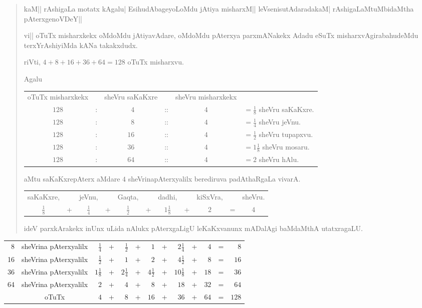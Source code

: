 \begin{verse}
kaM|| rAshigaLa motatx kAgalu| EsihudAbageyoLoMdu jAtiya misharxM||
leVsenisutAdaradakaM| rAshigaLaMtuMbidaMtha pAterxgenoVDeY||

vi|| oTuTx misharxkekx oMdoMdu jAtiyavAdare, oMdoMdu pAterxya
parxmANakekx Adadu eSuTx misharxvAgirabahudeMdu terxYrAshiyiMda kANa
takakxdudx. 

riVti, $4+8+16+36+64=128$ oTuTx misharxvu.

Agalu
\begin{center}
\begin{tabular}{cccccl}
oTuTx misharxkekx && sheVru saKaKxre && sheVru misharxkekx & \\[3pt]
$128$ &:& ~$4$ &::& $4$ & $=\frac{1}{8}$ sheVru saKaKxre.\\[4pt]
$128$ &:& ~$8$ &::& $4$ & $=\frac{1}{4}$ sheVru jeVnu.\\[4pt]
$128$ &:& $16$ &::& $4$ & $=\frac{1}{2}$ sheVru tupapxvu.\\[4pt]
$128$ &:& $36$ &::& $4$ & $=1\frac{1}{8}$ sheVru mosaru.\\[4pt]
$128$ &:& $64$ &::& $4$ & $=2$ sheVru hAlu.\\[4pt]
\end{tabular}
\end{center}

aMtu saKaKxrepAterx aMdare $4$ sheVrinapAterxyalilx berediruva
padAthaRgaLa vivarA.
\begin{center}
\begin{tabular}{ccccccccccc}
saKaKxre, & & jeVnu, && Gaqta, && dadhi, && kiSxVra, && sheVru.\\[5pt]
$\frac{1}{8}$ & + & $\frac{1}{4}$ & + & $\frac{1}{2}$ & + &
$1\frac{1}{8}$ & + & $2$ & = & $4$
\end{tabular}
\end{center}
ideV parxkArakekx inUnx uLida nAlukx pAterxgaLigU leKaKxvanunx
mADalAgi baMdaMthA utatxragaLU.
\end{verse}
\begin{center}
\begin{tabular}{>{\rm}rcrcrcrcrcrcr}
8 & sheVrina pAterxyalilx & $\frac{1}{4}$ & + & $\frac{1}{2}$ & + & $1$ & +
& $2\frac{1}{4}$ & + & $4$ & = & $8$\\[5pt]
16 & sheVrina pAterxyalilx & $\frac{1}{2}$ & + & $1$ & + & $2$ & + &
$4\frac{1}{2}$ & + & $8$ & = & $16$\\[5pt]
36 & sheVrina pAterxyalilx & $1\frac{1}{8}$ & + & $2\frac{1}{4}$ & + &
$4\frac{1}{2}$ & + & $10\frac{1}{8}$ & + & $18$ & = & $36$\\[5pt]
64 & sheVrina pAterxyalilx & $2$ & + & $4$ & + & $8$ & + & $18$ & + & $32$ & = &
$64$\\[3pt]
\cline{2-13}
 & oTuTx & $4$ & + & $8$ & + & $16$ & + & $36$ & + & $64$ & = & $128$\\
\cline{2-13}
\end{tabular}
\end{center}


